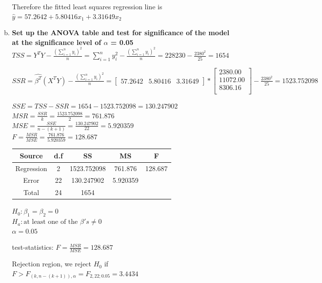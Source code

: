 \documentclass{article}
\begin{document}
\begin{enumerate}[1.]
\begin{enumerate}[(a)]
Therefore the fitted least squares regression line is $\hat{y} = 57.2642 + 5.80416x_1 + 3.31649x_2$

\item \textbf{ Set up the ANOVA table and test for significance of the model at the significance level of $\alpha$ = 0.05 } \\
$TSS = Y^TY - \frac{(\sum_{i=1}^{n}{y_i})^2}{n} = \sum_{i=1}^{n}{y_i^2} - \frac{(\sum_{i=1}^{n}{y_i})^2}{n}  = 228230 - \frac{2380^2}{25} = 1654$

$SSR = \hat{\beta^T}(X^TY)  - \frac{(\sum_{i=1}^{n}{y_i})^2}{n}  = \begin{bmatrix}
57.2642 & 5.80416 & 3.31649
\end{bmatrix} * \begin{bmatrix}
2380.00 \\
11072.00 \\
8306.16 \\
\end{bmatrix} - \frac{2380^2}{25} = 1523.752098$

$SSE = TSS - SSR = 1654 - 1523.752098 = 130.247902$ \\
$MSR = \frac{SSR}{k} = \frac{1523.752098}{2} = 761.876$ \\
$MSE = \frac{SSE}{n-(k+1)} = \frac{130.247902}{22} = 5.920359$ \\
$F = \frac{MSR}{MSE} = \frac{761.876}{5.920359} =128.687$ \\

\begin{center}
 \begin{tabular}{||c c c c c||} 
 \hline
Source & d.f & SS & MS & F \\ [0.5ex] 
 \hline\hline
Regression & 2 & 1523.752098 & 761.876 & 128.687 \\
 \hline
Error & 22 & 130.247902 &  5.920359 &  \\
 \hline
Total & 24  & 1654 & & \\ [1ex]
 \hline
\end{tabular}
\end{center}

$H_0: \beta_1 = \beta_2 = 0$ \\
$H_a: \text{at least one of the } \beta's \neq 0$ \\
$\alpha = 0.05$

test-statistics: $F = \frac{MSR}{MSE} = 128.687$

Rejection region, we reject $H_0$ if $F > F_{(k, n-(k+1)), \alpha} = F_{2, 22; 0.05} = 3.4434$


\end{enumerate}
\end{enumerate}
\end{document}
